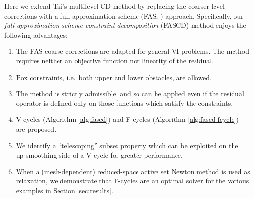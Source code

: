\documentclass[review,hidelinks,onefignum,onetabnum]{siamart220329}
\begin{document}
Here we extend Tai's multilevel CD method by replacing the coarser-level corrections with a full approximation scheme (FAS; \cite{Brandt1977,Bruneetal2015}) approach.  Specifically, our \emph{full approximation scheme constraint decomposition} (FASCD) method enjoys the following advantages:
\renewcommand{\labelenumi}{\emph{(\roman{enumi})}}
\begin{enumerate}
\item The FAS coarse corrections are adapted for general VI problems. The method requires neither an objective function nor linearity of the residual.
\item Box constraints, i.e.~both upper and lower obstacles, are allowed.
\item The method is strictly admissible, and so can be applied even if the residual operator is defined only on those functions which satisfy the constraints.
\item V-cycles (Algorithm \ref{alg:fascd}) and F-cycles (Algorithm \ref{alg:fascd-fcycle}) are proposed.
\item We identify a ``telescoping'' subset property which can be exploited on the up-smoothing side of a V-cycle for greater performance.
\item When a (mesh-dependent) reduced-space active set Newton method is used as relaxation, we demonstrate that F-cycles are an optimal solver for the various examples in Section \ref{sec:results}.
\end{enumerate}
\end{document}
